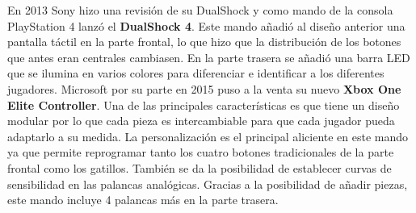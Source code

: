 En 2013 Sony hizo una revisi\'on de su DualShock y como mando de la consola PlayStation 4 lanz\'o el \textbf{DualShock 4}. Este mando a\~nadi\'o al dise\~no anterior una pantalla t\'actil en la parte frontal, lo que hizo que la distribuci\'on de los botones que antes eran centrales cambiasen. En la parte trasera se a\~nadi\'o una barra LED que se ilumina en varios colores para diferenciar e identificar a los diferentes jugadores. Microsoft por su parte en 2015 puso a la venta su nuevo \textbf{Xbox One Elite Controller}. Una de las principales caracter\'isticas es que tiene un dise\~no modular por lo que cada pieza es intercambiable para que cada jugador pueda adaptarlo a su medida. La personalizaci\'on es el principal aliciente en este mando ya que permite reprogramar tanto los cuatro botones tradicionales de la parte frontal como los gatillos. Tambi\'en se da la posibilidad de establecer curvas de sensibilidad en las palancas anal\'ogicas. Gracias a la posibilidad de a\~nadir piezas, este mando incluye 4 palancas m\'as en la parte trasera.\par

